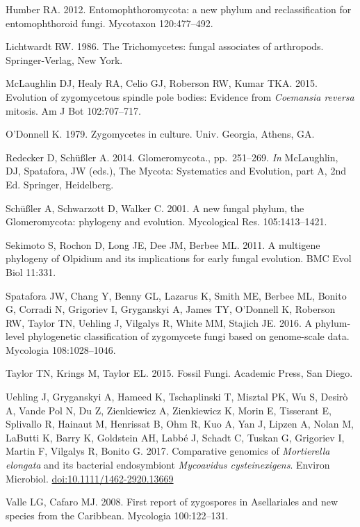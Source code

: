 \documentclass[]{book}
\begin{document}
Humber RA. 2012. Entomophthoromycota: a new phylum and reclassification
for entomophthoroid fungi. Mycotaxon 120:477--492.

Lichtwardt RW. 1986. The Trichomycetes: fungal associates of arthropods.
Springer-Verlag, New York.

McLaughlin DJ, Healy RA, Celio GJ, Roberson RW, Kumar TKA. 2015.
Evolution of zygomycetous spindle pole bodies: Evidence from
\emph{Coemansia reversa} mitosis. Am J Bot 102:707--717.

O'Donnell K. 1979. Zygomycetes in culture. Univ. Georgia, Athens, GA.

Redecker D, Schüßler A. 2014. Glomeromycota., pp.~251--269. \emph{In}
McLaughlin, DJ, Spatafora, JW (eds.), The Mycota: Systematics and
Evolution, part A, 2nd Ed. Springer, Heidelberg.

Schüßler A, Schwarzott D, Walker C. 2001. A new fungal phylum, the
Glomeromycota: phylogeny and evolution. Mycological Res. 105:1413--1421.

Sekimoto S, Rochon D, Long JE, Dee JM, Berbee ML. 2011. A multigene
phylogeny of Olpidium and its implications for early fungal evolution.
BMC Evol Biol 11:331.

Spatafora JW, Chang Y, Benny GL, Lazarus K, Smith ME, Berbee ML, Bonito
G, Corradi N, Grigoriev I, Gryganskyi A, James TY, O'Donnell K, Roberson
RW, Taylor TN, Uehling J, Vilgalys R, White MM, Stajich JE. 2016. A
phylum-level phylogenetic classification of zygomycete fungi based on
genome-scale data. Mycologia 108:1028--1046.

Taylor TN, Krings M, Taylor EL. 2015. Fossil Fungi. Academic Press, San
Diego.

Uehling J, Gryganskyi A, Hameed K, Tschaplinski T, Misztal PK, Wu S,
Desirò A, Vande Pol N, Du Z, Zienkiewicz A, Zienkiewicz K, Morin E,
Tisserant E, Splivallo R, Hainaut M, Henrissat B, Ohm R, Kuo A, Yan J,
Lipzen A, Nolan M, LaButti K, Barry K, Goldstein AH, Labbé J, Schadt C,
Tuskan G, Grigoriev I, Martin F, Vilgalys R, Bonito G. 2017. Comparative
genomics of \emph{Mortierella elongata} and its bacterial endosymbiont
\emph{Mycoavidus cysteinexigens}. Environ Microbiol.
\url{doi:10.1111/1462-2920.13669}

Valle LG, Cafaro MJ. 2008. First report of zygospores in Asellariales
and new species from the Caribbean. Mycologia 100:122--131.
\end{document}
